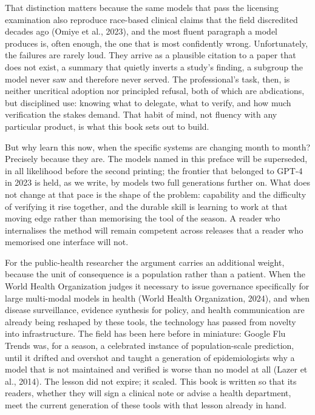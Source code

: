 \documentclass[
  letterpaper,
  11pt]{scrbook}
\begin{document}
That distinction matters because the same models that pass the licensing
examination also reproduce race-based clinical claims that the field
discredited decades ago (Omiye et al., 2023), and the most fluent
paragraph a model produces is, often enough, the one that is most
confidently wrong. Unfortunately, the failures are rarely loud. They
arrive as a plausible citation to a paper that does not exist, a summary
that quietly inverts a study's finding, a subgroup the model never saw
and therefore never served. The professional's task, then, is neither
uncritical adoption nor principled refusal, both of which are
abdications, but disciplined use: knowing what to delegate, what to
verify, and how much verification the stakes demand. That habit of mind,
not fluency with any particular product, is what this book sets out to
build.

But why learn this now, when the specific systems are changing month to
month? Precisely because they are. The models named in this preface will
be superseded, in all likelihood before the second printing; the
frontier that belonged to GPT-4 in 2023 is held, as we write, by models
two full generations further on. What does not change at that pace is
the shape of the problem: capability and the difficulty of verifying it
rise together, and the durable skill is learning to work at that moving
edge rather than memorising the tool of the season. A reader who
internalises the method will remain competent across releases that a
reader who memorised one interface will not.

For the public-health researcher the argument carries an additional
weight, because the unit of consequence is a population rather than a
patient. When the World Health Organization judges it necessary to issue
governance specifically for large multi-modal models in health (World
Health Organization, 2024), and when disease surveillance, evidence
synthesis for policy, and health communication are already being
reshaped by these tools, the technology has passed from novelty into
infrastructure. The field has been here before in miniature: Google Flu
Trends was, for a season, a celebrated instance of population-scale
prediction, until it drifted and overshot and taught a generation of
epidemiologists why a model that is not maintained and verified is worse
than no model at all (Lazer et al., 2014). The lesson did not expire; it
scaled. This book is written so that its readers, whether they will sign
a clinical note or advise a health department, meet the current
generation of these tools with that lesson already in hand.
\end{document}
